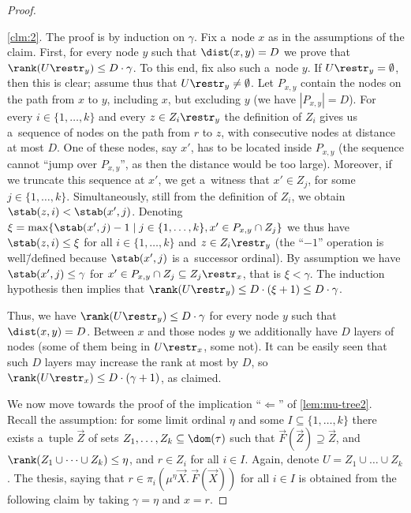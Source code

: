 \begin{proof}
	\begin{proofof}{\cref{clm:2}.}
		The proof is by induction on $\gamma$.
		Fix a~node $x$ as in the assumptions of the claim.
		First, for every node $y$ such that $\dist(x,y)=D$ we prove that $\rank(U\restr_y)\leq D\cdot\gamma$.
		To this end, fix also such a~node $y$.
		If $U\restr_y=\emptyset$, then this is clear; assume thus that $U\restr_y\neq\emptyset$.
		Let $P_{x,y}$ contain the nodes on the path from $x$ to $y$, including $x$, but excluding $y$ (we have $|P_{x,y}|=D$).
		For every $i\in\{1,\dots,k\}$ and every $z\in Z_i\restr_y$ the definition of $Z_i$ gives us a~sequence of nodes on the path from $r$ to $z$, with consecutive nodes at distance at most $D$.
		One of these nodes, say $x'$, has to be located inside $P_{x,y}$ (the sequence cannot ``jump over $P_{x,y}$'', as then the distance would be too large).
		Moreover, if we truncate this sequence at $x'$, we get a~witness that $x'\in Z_j$, for some $j\in\{1,\dots,k\}$.
		Simultaneously, still from the definition of $Z_i$, we obtain $\stab(z,i)<\stab(x',j)$.
		Denoting $\xi=\max\{\stab(x',j)-1\mid j\in\{1,\dots,k\},x'\in P_{x,y}\cap Z_j\}$ we thus have $\stab(z,i)\leq\xi$ for all $i\in\{1,\dots,k\}$ and $z\in Z_i\restr_y$
		(the ``$-1$'' operation is well\=/defined because $\stab(x',j)$ is a~successor ordinal).
		By assumption we have $\stab(x',j)\leq\gamma$ for $x'\in P_{x,y}\cap Z_j\subseteq Z_j\restr_x$, that is $\xi<\gamma$.
		The induction hypothesis then implies that $\rank(U\restr_y)\leq D\cdot(\xi+1)\leq D\cdot\gamma$.

		Thus, we have $\rank(U\restr_y)\leq D\cdot\gamma$ for every node $y$ such that $\dist(x,y)=D$.
		Between $x$ and those nodes $y$ we additionally have $D$ layers of nodes (some of them being in $U\restr_x$, some not).
		It can be easily seen that such $D$ layers may increase the rank at most by $D$, so $\rank(U\restr_x)\leq D\cdot(\gamma+1)$, as claimed.
	\end{proofof}
	
	We now move towards the proof of the implication ``$\Leftarrow$'' of \cref{lem:mu-tree2}.
	Recall the assumption: for some limit ordinal $\eta$ and some $I\subseteq\{1,\dots,k\}$
	there exists a~tuple $\vec{Z}$ of sets $Z_1,\dots,Z_k\subseteq\dom(\tau)$ such that $\vec{F}(\vec{Z})\supseteq\vec{Z}$, and $\rank(Z_1\cup\dots\cup Z_k)\leq\eta$, and $r\in Z_i$ for all $i\in I$.
	Again, denote $U=Z_1\cup\dots\cup Z_k$.
	The thesis, saying that $r\in\pi_i(\mu^\eta\vec{X}.\,\vec{F}(\vec{X}))$ for all $i\in I$ is obtained from the following claim by taking $\gamma=\eta$ and $x=r$.


\end{proof}
